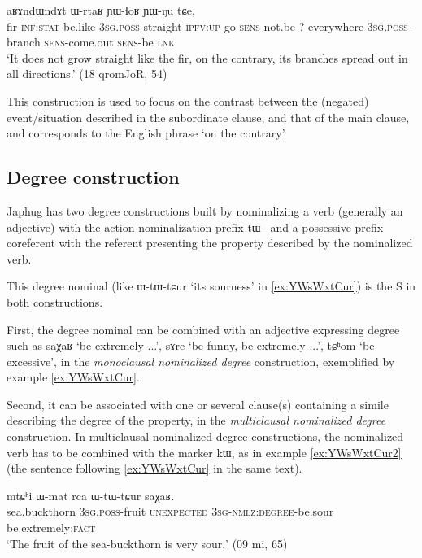 \documentclass[oldfontcommands,oneside,a4paper,11pt]{article}
\newcommand{\ipa}[1]{{\phon #1}} %
\begin{document}
  \begin{exe} 
 \ex \label{ex:YWmaR.kW}
\gll [\ipa{tɯrgi} 	\ipa{kɯ-fse} 	\ipa{ɯ-stu} 	\ipa{tu-ɕe} 	\ipa{ɲɯ-maʁ}] 	\ipa{kɯ,} \ipa{aʁɤndɯndɤt} 	\ipa{ɯ-rtaʁ} 	\ipa{ɲɯ-ɬoʁ} 	\ipa{ɲɯ-ŋu} 	\ipa{tɕe,} 
\\
fir \textsc{inf:stat}-be.like \textsc{3sg.poss}-straight \textsc{ipfv:up}-go \textsc{sens}-not.be ?{ } everywhere \textsc{3sg.poss}-branch \textsc{sens}-come.out \textsc{sens}-be \textsc{lnk} \\ 
\glt `It does not grow straight like the fir, on the contrary, its branches spread out in all directions.'  
(18 qromJoR, 54)
 \end{exe}  
 
 This construction is used to focus on the contrast between the (negated) event/situation described in the subordinate clause, and that of the main clause, and corresponds to the English phrase `on the contrary'.
 
\subsection{Degree construction} \label{sec:degree}
 
 
Japhug has two degree constructions built by nominalizing a verb (generally an adjective)  with the action nominalization prefix  \ipa{tɯ--}  and a possessive prefix coreferent with the referent presenting the property described by the nominalized verb. 

This degree nominal (like \ipa{ɯ-tɯ-tɕur} `its sourness' in \ref{ex:YWsWxtCur}) is the S in both constructions.

First, the degree nominal can be  combined with an adjective expressing degree such as \ipa{saχaʁ} `be extremely ...', \ipa{sɤre} `be funny, be extremely ...', \ipa{tɕʰom} `be excessive', in the \textit{monoclausal nominalized degree} construction, exemplified by example \ref{ex:YWsWxtCur}.

Second, it can be associated  with one or several  clause(s) containing a simile describing the degree of the property, in the \textit{multiclausal nominalized degree} construction. In multiclausal nominalized degree constructions, the nominalized verb has to be combined with the marker \ipa{kɯ}, as in   example \ref{ex:YWsWxtCur2} (the sentence following  \ref{ex:YWsWxtCur} in the same text).



\begin{exe}
\ex \label{ex:YWsWxtCur}
\gll 
\ipa{mtɕʰi}  	\ipa{ɯ-mat}  	\ipa{rca}  	\ipa{ɯ-tɯ-tɕur}  	\ipa{saχaʁ.}  	   \\
sea.buckthorn \textsc{3sg.poss}-fruit \textsc{unexpected} \textsc{3sg-nmlz:degree}-be.sour be.extremely:\textsc{fact}   \\
\glt `The fruit of the sea-buckthorn is very sour,' (09 mi, 65)
\end{exe}
\end{document}
